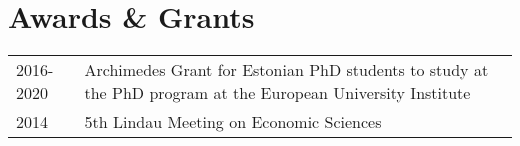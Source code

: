 \documentclass[a4, 11pt]{article}
\begin{document}
    \section*{Awards \& Grants}
  \begin{table}[H]
      \begin{tabular}{p{2cm}p{14cm}}
          2016-2020 & {Archimedes Grant for Estonian PhD students}{} to study at the PhD program at the European University Institute\\
          2014 & {5th Lindau Meeting on Economic Sciences}{}\\
      \end{tabular}
    \end{table}

    
\end{document}
